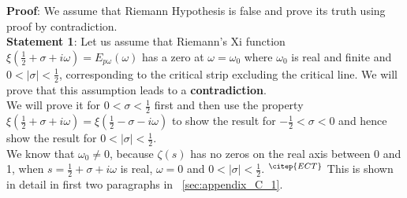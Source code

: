 \documentclass[11pt]{elsarticle}
\begin{document}
\textbf{Proof}: We assume that Riemann Hypothesis is false and prove its truth using proof by contradiction.\\

\textbf{Statement 1}: Let us assume that Riemann's Xi function $\xi(\frac{1}{2} + \sigma + i \omega)= E_{p\omega}(\omega)$ has a zero at $\omega = \omega_{0}$ where $\omega_{0}$ is real and finite and $0 < |\sigma| < \frac{1}{2}$, corresponding to the critical strip excluding the critical line.  We will prove that this assumption leads to a \textbf{contradiction}. \\

We will prove it for $0 < \sigma < \frac{1}{2}$ first and then use the property $\xi(\frac{1}{2} + \sigma + i \omega) = \xi(\frac{1}{2} - \sigma - i \omega)$ to show the result for $-\frac{1}{2} < \sigma < 0$ and hence show the result for  $0 < |\sigma| < \frac{1}{2}$.\\

We know that $\omega_{0} \neq 0$, because $\zeta(s)$ has no zeros on the real axis between 0 and 1, when $s=\frac{1}{2}+\sigma + i \omega$ is real, $\omega=0$ and $0 < |\sigma| < \frac{1}{2}$. $^{\citep{ECT}}$ This is shown in detail in first two paragraphs in ~\ref{sec:appendix_C_1}.


\end{document}
